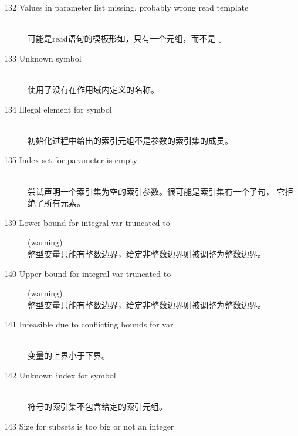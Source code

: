 \begin{description}
\item[132 Values in parameter list missing, probably wrong read
  template]\ \\
  可能是read语句的模板形如，只有一个元组，而不是
  。
\item[133 Unknown symbol ]\ \\
  使用了没有在作用域内定义的名称。
\item[134 Illegal element  for symbol]\ \\
  初始化过程中给出的索引元组不是参数的索引集的成员。
\item[135 Index set for parameter  is empty]\ \\
  尝试声明一个索引集为空的索引参数。很可能是索引集有一个子句，
  它拒绝了所有元素。
%
%
\item[139 Lower bound for integral var  truncated to ]
  (warning)\ \\
  整型变量只能有整数边界，给定非整数边界则被调整为整数边界。
\item[140 Upper bound for integral var  truncated to ]
  (warning)\ \\
  整型变量只能有整数边界，给定非整数边界则被调整为整数边界。
\item[141 Infeasible due to conflicting bounds for var ]\ \\
  变量的上界小于下界。
\item[142 Unknown index  for symbol ]\ \\
  符号的索引集不包含给定的索引元组。
\item[143 Size for subsets  is too big or not an integer]\ \\

\end{description}
